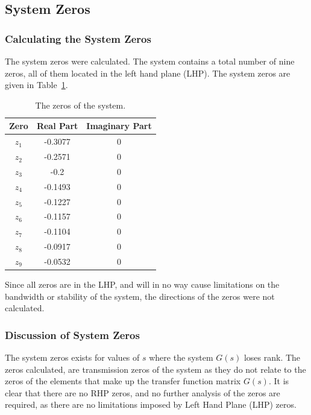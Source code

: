 \subsection{System Zeros}
\label{sec:System Zeros}
\subsubsection{Calculating the System Zeros}

The system zeros were calculated. The system contains a total number of nine zeros, all of them located in the left hand plane (LHP). The system zeros are given in Table~\ref{tab: Zeros of system}.

\begin{table}[H]
	\centering
	\caption{The zeros of the system.}
	\begin{tabular}{ccc}
		\hline
		\textbf{Zero} & \textbf{Real Part} & \textbf{Imaginary Part} \\\hline
		$z_1$            & -0.3077            & 0                       \\
		$z_2$            & -0.2571            & 0                       \\
		$z_3$            & -0.2            & 0                  \\
		$z_4$            & -0.1493            & 0                 \\
		$z_5$            & -0.1227             & 0                  \\
		$z_6$            & -0.1157             & 0   \\
		$z_7$            & -0.1104             & 0   \\
		$z_8$            & -0.0917             & 0   \\
		$z_9$            & -0.0532             & 0   \\\hline             
	\end{tabular}
	\label{tab: Zeros of system}
\end{table}

Since all zeros are in the LHP, and will in no way cause limitations on the bandwidth or stability of the system, the directions of the zeros were not calculated.

\subsubsection{Discussion of System Zeros}

The system zeros exists for values of $s$ where the system $G(s)$ loses rank. The zeros calculated, are transmission zeros of the system as they do not relate to the zeros of the elements that make up the transfer function matrix $G(s)$. It is clear that there are no RHP zeros, and no further analysis of the zeros are required, as there are no limitations imposed by Left Hand Plane (LHP) zeros. 


